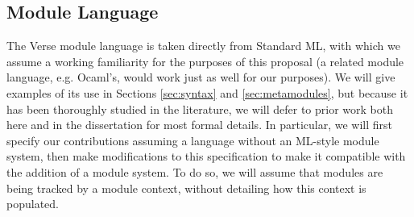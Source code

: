 \subsection{Module Language}
The Verse module language is taken directly from Standard ML, with which we assume a working familiarity for the purposes of this proposal \cite{harper1997programming,MacQueen:1984:MSM:800055.802036} (a related module language, e.g. Ocaml's, would work just as well for our purposes). We will give examples of its use in Sections \ref{sec:syntax} and \ref{sec:metamodules}, but because it has been thoroughly studied in the literature, we will defer to prior work both here and in the dissertation for most formal details. In particular, we will first specify our contributions assuming a language without an ML-style module system, then make modifications to this specification to make it compatible with the addition of a module system. To do so, we will assume that modules are being tracked by a module context, without detailing how this context is populated. %



